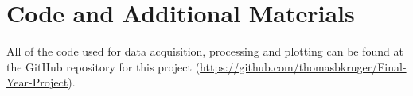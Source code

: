 \chapter{Code and Additional Materials}
\label{appendix:code}
All of the code used for data acquisition, processing and plotting can be found at the GitHub repository for this project (\href{https://github.com/thomasbkruger/Final-Year-Project}{https://github.com/thomasbkruger/Final-Year-Project}). 
